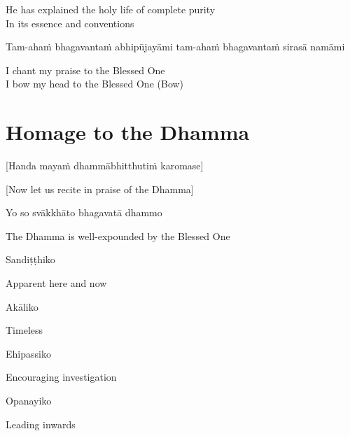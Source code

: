 \begin{english}
  He has explained the holy life of complete purity\\
  In its essence and conventions
\end{english}

Tam-ahaṁ bhagavantaṁ abhipūjayāmi tam-ahaṁ bhagavantaṁ sirasā namāmi
\begin{english}
  I chant my praise to the Blessed One\\
  I bow my head to the Blessed One \hfill{(Bow)}
\end{english}

\section{Homage to the Dhamma}
\label{homage-dhamma}

\begin{center}
  [Handa mayaṁ dhammābhitthutiṁ karomase]
\end{center}
\begin{center}
  [Now let us recite in praise of the Dhamma]
\end{center}

Yo so svākkhāto bhagavatā dhammo

\begin{english}
  The Dhamma is well-expounded by the Blessed One
\end{english}

Sandiṭṭhiko

\begin{english}
  Apparent here and now
\end{english}

Akāliko

\begin{english}
  Timeless
\end{english}

Ehipassiko

\begin{english}
  Encouraging investigation
\end{english}

Opanayiko

\begin{english}
  Leading inwards
\end{english}

